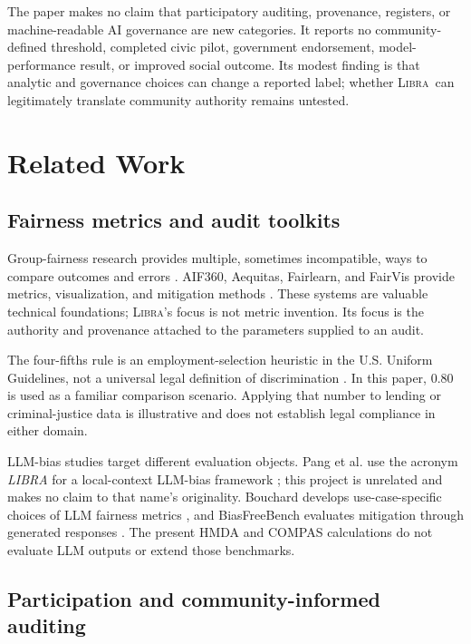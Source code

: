 \documentclass[10pt]{article}
\newcommand{\libra}{\textsc{Libra}}
\begin{document}
The paper makes no claim that participatory auditing, provenance, registers, or
machine-readable AI governance are new categories. It reports no
community-defined threshold, completed civic pilot, government endorsement,
model-performance result, or improved social outcome. Its modest finding is
that analytic and governance choices can change a reported label; whether
\libra\ can legitimately translate community authority remains untested.

\section{Related Work}

\subsection{Fairness metrics and audit toolkits}

Group-fairness research provides multiple, sometimes incompatible, ways to
compare outcomes and errors \cite{chouldechova2017,kleinberg2017}. AIF360,
Aequitas, Fairlearn, and FairVis provide metrics, visualization, and mitigation
methods \cite{bellamy2018,saleiro2018,weerts2023,cabrera2019}. These systems are
valuable technical foundations; \libra's focus is not metric invention. Its
focus is the authority and provenance attached to the parameters supplied to an
audit.

The four-fifths rule is an employment-selection heuristic in the U.S. Uniform
Guidelines, not a universal legal definition of discrimination
\cite{eeoc1978}. In this paper, $0.80$ is used as a familiar comparison scenario.
Applying that number to lending or criminal-justice data is illustrative and
does not establish legal compliance in either domain.

LLM-bias studies target different evaluation objects. Pang et al. use the
acronym \emph{LIBRA} for a local-context LLM-bias framework
\cite{pang2025}; this project is unrelated and makes no claim to that name's
originality. Bouchard develops use-case-specific choices of LLM fairness
metrics \cite{bouchard2026}, and BiasFreeBench evaluates mitigation through
generated responses \cite{xu2026}. The present HMDA and COMPAS calculations
do not evaluate LLM outputs or extend those benchmarks.

\subsection{Participation and community-informed auditing}
\end{document}
